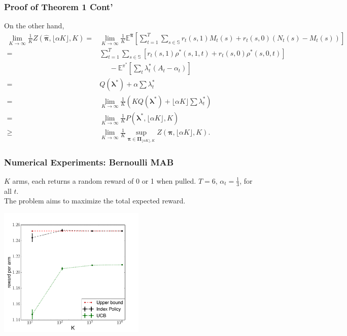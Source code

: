 \documentclass{beamer}
\newcommand{\Eb}{\mathbb{E}}
\newcommand{\lambdav}{\pmb{\lambda}}
\newcommand{\allp}{\pmb{\pi}}
\newcommand{\allpset}{\mathbf{\Pi}}
\newcommand{\subp}{\pi}
\newcommand{\substates}{\mathbb{S}}
\begin{document}
\begin{frame}
\frametitle{Proof of Theorem 1 Cont'}
On the other hand,
\footnotesize
\begin{align*}
\lim_{K\rightarrow\infty}\frac{1}{K}Z(\hat{\allp},\lfloor \alpha K\rfloor,K) 
=&\lim_{K\rightarrow\infty}\frac{1}{K}\Eb^{\hat{\allp}}\left[\sum_{t=1}^{T}\sum_{s\in\substates}r_t(s,1) M_{t}(s)+r_t(s,0) (N_{t}(s)-M_{t}(s))\right]\\
=&\sum_{t=1}^{T}\sum_{s\in \substates}\left[r_t(s,1) \rho^*(s,1,t)+r_t(s,0) \rho^*(s,0,t) \right]\\
&\;\;\;\;\;-\mathbb{E}^{\subp^*}\left[\sum_{t}\lambda^*_t \left(A_t-\alpha_t\right)\right]\\
=& Q(\lambdav^*)+\alpha \sum\lambda^*_t\\
=& \lim_{K\rightarrow\infty}\frac{1}{K}(KQ(\lambdav^*)+\lfloor \alpha K \rfloor\sum\lambda^*_t)\\
=& \lim_{K\rightarrow\infty}\frac{1}{K} P(\lambdav^*,\lfloor \alpha K \rfloor, K)\\
\geq& \lim_{K\rightarrow\infty}\frac{1}{K}\sup_{\allp\in\allpset_{\lfloor \alpha K\rfloor,K}}Z(\allp,\lfloor \alpha K\rfloor,K).
\end{align*}
\end{frame}

\begin{frame}
\frametitle{Numerical Experiments: Bernoulli MAB}
$K$ arms, each returns a random reward of 0 or 1 when pulled. $T=6$, $\alpha_t=\frac{1}{3}$, for all $t$.\\
The problem aims to maximize the total expected reward.
\begin{center}
\includegraphics[width=70mm]{plot_mab.pdf}
\end{center}

\end{frame}
\end{document}

